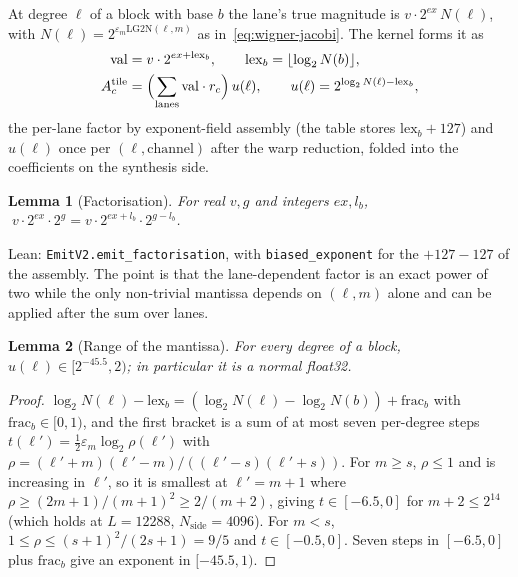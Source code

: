 \documentclass[usenatbib,useAMS]{mnras}
\newtheorem{lemma}{Lemma}
\begin{document}
At degree $\ell$ of a block with base $b$ the lane's true magnitude is $v\cdot2^{ex}\,N(\ell)$, with $N(\ell)=2^{\varepsilon_m\mathrm{LG2N}(\ell,m)}$ as in~\eqref{eq:wigner-jacobi}. The kernel forms it as
\begin{equation}
\label{eq:emitfac}
\begin{split}
 \mathrm{val}&=v\cdot2^{ex+\mathrm{lex}_b},\qquad \mathrm{lex}_b=\lfloor\log_2N(b)\rfloor,\\
 A^{\mathrm{tile}}_c&=\Bigl(\sum_{\mathrm{lanes}}\mathrm{val}\cdot r_c\Bigr)\,u(\ell),\qquad
 u(\ell)=2^{\log_2N(\ell)-\mathrm{lex}_b},
\end{split}
\end{equation}
the per-lane factor by exponent-field assembly (the table stores $\mathrm{lex}_b+127$) and $u(\ell)$ once per $(\ell,\mathrm{channel})$ after the warp reduction, folded into the coefficients on the synthesis side.

\begin{lemma}[Factorisation]
\label{lem:fac}
For real $v,g$ and integers $ex,l_b$, $\;v\cdot2^{ex}\cdot2^{g}=v\cdot2^{ex+l_b}\cdot2^{g-l_b}$.
\end{lemma}

Lean: \texttt{EmitV2.emit\_factorisation}, with \texttt{biased\_exponent} for the $+127-127$ of the assembly. The point is that the lane-dependent factor is an exact power of two while the only non-trivial mantissa depends on $(\ell,m)$ alone and can be applied after the sum over lanes.

\begin{lemma}[Range of the mantissa]
\label{lem:urange}
For every degree of a block, $u(\ell)\in[2^{-45.5},2)$; in particular it is a normal float32.
\end{lemma}

\begin{proof}
$\log_2N(\ell)-\mathrm{lex}_b=(\log_2N(\ell)-\log_2N(b))+\mathrm{frac}_b$ with $\mathrm{frac}_b\in[0,1)$, and the first bracket is a sum of at most seven per-degree steps $t(\ell')=\tfrac12\varepsilon_m\log_2\rho(\ell')$ with $\rho=(\ell'+m)(\ell'-m)/((\ell'-s)(\ell'+s))$. For $m\ge s$, $\rho\le1$ and is increasing in $\ell'$, so it is smallest at $\ell'=m+1$ where $\rho\ge(2m+1)/(m+1)^2\ge2/(m+2)$, giving $t\in[-6.5,0]$ for $m+2\le2^{14}$ (which holds at $L=12288$, $N_{\mathrm{side}}=4096$). For $m<s$, $1\le\rho\le(s+1)^2/(2s+1)=9/5$ and $t\in[-0.5,0]$. Seven steps in $[-6.5,0]$ plus $\mathrm{frac}_b$ give an exponent in $[-45.5,1)$.
\end{proof}
\end{document}
